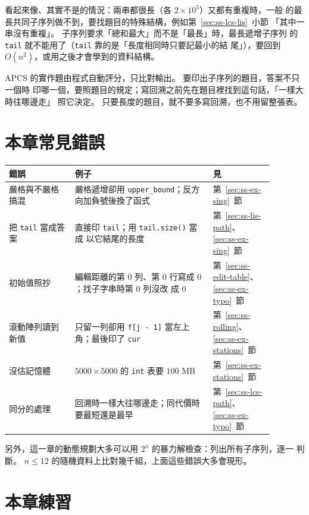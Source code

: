 看起來像、其實不是的情況：兩串都很長（各 $2 \times 10^5$）又都有重複時，一般
的最長共同子序列做不到，要找題目的特殊結構，例如第~\ref{sec:ss-lcs-lis}~小節
「其中一串沒有重複」。 子序列要求「總和最大」而不是「最長」時，最長遞增子序列
的 \texttt{tail} 就不能用了（\texttt{tail} 靠的是「長度相同時只要記最小的結
尾」），要回到 $O(n^2)$，或用之後才會學到的資料結構。

\begin{apcsnote}
APCS 的實作題由程式自動評分，只比對輸出。 要印出子序列的題目，答案不只一個時
印哪一個，要照題目的規定；寫回溯之前先在題目裡找到這句話，「一樣大時往哪邊走」
照它決定。 只要長度的題目，就不要多寫回溯，也不用留整張表。
\end{apcsnote}

\section{本章常見錯誤}
\label{sec:ss-pitfalls}

\begin{center}
\begin{tabular}{p{0.22\linewidth}p{0.46\linewidth}p{0.2\linewidth}}
\toprule
錯誤 & 例子 & 見 \\
\midrule
嚴格與不嚴格搞混 & 嚴格遞增卻用 \texttt{upper\_bound}；反方向加負號後換了函式 &
第~\ref{sec:ss-ex-sing}~節 \\
把 \texttt{tail} 當成答案 & 直接印 \texttt{tail}；用 \texttt{tail.size()} 當成
以它結尾的長度 & 第~\ref{sec:ss-lis-path}、\ref{sec:ss-ex-sing}~節 \\
初始值照抄 & 編輯距離的第 $0$ 列、第 $0$ 行寫成 $0$；找子字串時第 $0$ 列沒改
成 $0$ & 第~\ref{sec:ss-edit-table}、\ref{sec:ss-ex-typo}~節 \\
滾動陣列讀到新值 & 只留一列卻用 \texttt{f[j - 1]} 當左上角；最後印了
\texttt{cur} & 第~\ref{sec:ss-rolling}、\ref{sec:ss-ex-stations}~節 \\
沒估記憶體 & $5000 \times 5000$ 的 \texttt{int} 表要 $100$ MB &
第~\ref{sec:ss-ex-stations}~節 \\
同分的處理 & 回溯時一樣大往哪邊走；同代價時要最短還是最早 &
第~\ref{sec:ss-lcs-path}、\ref{sec:ss-ex-typo}~節 \\
\bottomrule
\end{tabular}
\end{center}

另外，這一章的動態規劃大多可以用 $2^n$ 的暴力解檢查：列出所有子序列，逐一
判斷。 $n \le 12$ 的隨機資料上比對幾千組，上面這些錯誤大多會現形。

\section{本章練習}
\label{sec:ss-exercises}

